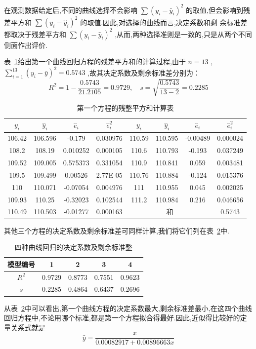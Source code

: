 在观测数据给定后,不同的曲线选择不会影响 $ \sum (y_i-\bar{y}_i)^2 $ 的取值,但会影响到残差平方和 $ \sum (y_i-\hat{y}_i)^2 $ 的取值.因此,对选择的曲线而言,决定系数和剩
余标准差都取决于残差平方和 $ \sum (y_i-\hat{y}_i)^2 $ ,从而,两种选择准则是一致的,只是从两个不同侧面作出评价.

表~\ref{tab:8.5.4}给出第一个曲线回归方程的残差平方和的计算过程,由于 $ n=13 $ ,
$ \sum\limits_{i=1}^{13}(y_i-\bar{y})^2=0.5743 $ ,故其决定系数及剩余标准差分别为：
\[
R^{2}=1-\frac{0.5743}{21.2105}=0.9729, \quad s=\sqrt{\frac{0.5743}{13-2}}=0.2285
\]
\begin{table}[htbp]
	\centering
	\caption{第一个方程的残整平方和计算表}
	\begin{tabular}{cccc|cccc}
		\toprule
		$ y_i $   &  $ \hat{y}_i $  &  $ \hat{e}_i $  &  $ \hat{e}_i^2 $  &  $ y_i $   &  $ \hat{y}_i $  &  $ \hat{e}_i $  &  $ \hat{e}_i^2 $  \\\midrule
		106.42 & 106.596 & -0.179 & 0.030976 & 110.59 & 110.595 & -0.00489 & 0.000024 \\
		108.2 & 108.19 & 0.010252 & 0.000105 & 110.6 & 110.793 & -0.193 & 0.037249 \\
		109.52 & 109.005 & 0.575373 & 0.331054 & 110.9 & 110.841 & 0.059 & 0.003481 \\
		109.5 & 109.499 & 0.00526 & 2.77E-05 & 110.76 & 110.884 & -0.124 & 0.015376 \\
		110   & 110.071 & -0.07054 & 0.004976 & 111   & 110.955 & 0.045 & 0.002025 \\
		109.93 & 110.25 & -0.32023 & 0.102544 & 111.2 & 110.984 & 0.216 & 0.046656 \\
		110.49 & 110.503 & -0.01277 & 0.000163 & \multicolumn{3}{c}{和} & 0.5743 \\\bottomrule
	\end{tabular}%
	\label{tab:8.5.4}%
\end{table}%
其他三个方程的决定系数及剩余标准差可同样计算,我们将它们列在表~\ref{tab:8.5.5}中.
\begin{table}[htb]
	\centering
	\caption{四种曲线回归的决定系数及剩余标准整}
	\begin{tabular}{ccccc}
		\toprule
		模型编号  & 1     & 2     & 3     & 4 \\\midrule
		$ R^2 $     & 0.9729 & 0.8773 & 0.7551 & 0.9623 \\
		$ s $      & 0.2285 & 0.4864 & 0.6437 & 0.2696 \\\bottomrule
	\end{tabular}%
	\label{tab:8.5.5}%
\end{table}%
从表~\ref{tab:8.5.5}中可以看出,第一个曲线方程的决定系数最大,剩余标准差最小,在这四个曲线回归方程中,不论用哪个标准,都是第一个方程拟合得最好.因此,近似得比较好的定量关系式就是
\[
\hat{y}=\frac{x}{0.00082917+0.008 96663x}	
\]


